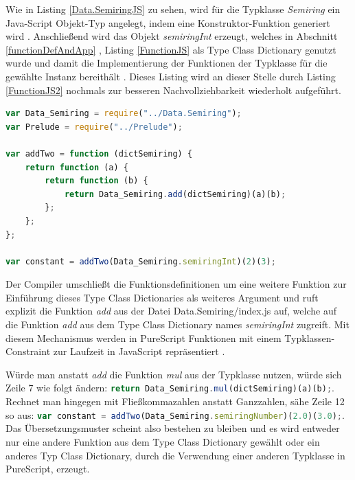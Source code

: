 \documentclass[
12pt,
ngerman,
oneside]
{scrbook} %
\begin{document}
Wie in Listing \ref{Data.SemiringJS} zu sehen, wird für die Typklasse \emph{Semiring} ein Java-Script Objekt-Typ angelegt, indem eine Konstruktor-Funktion generiert wird \cite{w3schoolsJSObjectTypes18}. Anschließend wird das Objekt \emph{semiringInt} erzeugt, welches in Abschnitt \glqq \ref{functionDefAndApp} \grqq{}, Listing \ref{FunctionJS} als \glqq Type Class Dictionary\grqq{} genutzt wurde und damit die Implementierung der Funktionen der Typklasse für die gewählte Instanz bereithält \cite[][S. 146--147]{Freeman17}. Dieses Listing wird an dieser Stelle durch Listing \ref{FunctionJS2} nochmals zur besseren Nachvollziehbarkeit wiederholt aufgeführt.

\begin{lstlisting}[language=javascript, style=numbered-and-boxed, caption= Funktionen in JavaScript - Kopie, label=FunctionJS2]
var Data_Semiring = require("../Data.Semiring");
var Prelude = require("../Prelude");

var addTwo = function (dictSemiring) {
	return function (a) {
		return function (b) {
			return Data_Semiring.add(dictSemiring)(a)(b);
		};
	};
};

var constant = addTwo(Data_Semiring.semiringInt)(2)(3);
\end{lstlisting}

Der Compiler umschließt die Funktionsdefinitionen um eine weitere Funktion zur Einführung dieses Type Class Dictionaries als weiteres Argument und ruft explizit die Funktion \emph{add} aus der Datei Data.Semiring/index.js auf, welche auf die Funktion \emph{add} aus dem Type Class Dictionary names \emph{semiringInt} zugreift. Mit diesem Mechanismus werden in PureScript Funktionen mit einem Typklassen-Constraint zur Laufzeit in JavaScript repräsentiert \cite[][S. 148]{Freeman17}.

Würde man anstatt \emph{add} die Funktion \emph{mul} aus der Typklasse nutzen, würde sich Zeile 7 wie folgt ändern: \glqq\lstinline[language=javascript, columns=fixed]{return Data_Semiring.mul(dictSemiring)(a)(b);}\grqq{}. Rechnet man hingegen mit Fließkommazahlen anstatt Ganzzahlen, sähe Zeile 12 so aus: \glqq\lstinline[language=javascript, columns=fixed]{var constant = addTwo(Data_Semiring.semiringNumber)(2.0)(3.0);}\grqq{}. Das Übersetzungsmuster scheint also bestehen zu bleiben und es wird entweder nur eine andere Funktion aus dem Type Class Dictionary gewählt oder ein anderes Typ Class Dictionary, durch die Verwendung einer anderen Typklasse in PureScript, erzeugt.
\end{document}

